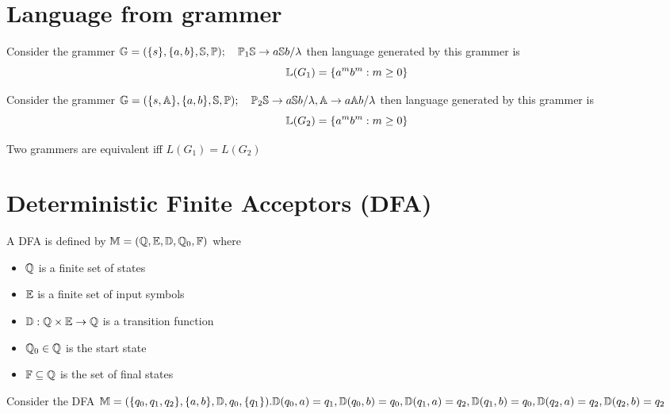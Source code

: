 
\section{Language from grammer}

\begin{example}
    Consider the grammer $ \mathbb{G} = ( \{s\} , \{a, b\} , \mathbb{S}, \mathbb{P} ) ; \quad \mathbb{P}_1 \mathbb{S} \rightarrow a \mathbb{S} b / \lambda $ then language generated by this grammer is $$\mathbb{L}(G_1) = \{ a^mb^m : m \geq 0 \} $$
\end{example}

\begin{example}
    Consider the grammer $ \mathbb{G} = ( \{s, \mathbb{A} \} , \{a, b\} , \mathbb{S}, \mathbb{P} ) ; \quad \mathbb{P}_2 \mathbb{S} \rightarrow a \mathbb{S} b / \lambda, \mathbb{A} \rightarrow a \mathbb{A} b / \lambda $ then language generated by this grammer is $$\mathbb{L}(G_2) = \{ a^mb^m : m \geq 0 \} $$
\end{example}

\begin{definition}{}
    Two grammers are equivalent iff $L(G_1) = L(G_2)$
\end{definition}

\section{Deterministic Finite Acceptors (DFA)}

\begin{definition}{}
    A DFA is defined by $\mathbb{M} = ( \mathbb{Q}, \mathbb{E}, \mathbb{D}, \mathbb{Q}_0, \mathbb{F} )$ where \begin{itemize}
        \item $\mathbb{Q}$ is a finite set of states
        \item $\mathbb{E}$ is a finite set of input symbols
        \item $\mathbb{D} : \mathbb{Q} \times \mathbb{E} \rightarrow \mathbb{Q}$ is a transition function
        \item $\mathbb{Q}_0 \in \mathbb{Q}$ is the start state
        \item $\mathbb{F} \subseteq \mathbb{Q}$ is the set of final states
    \end{itemize}
\end{definition}

\begin{example}
    Consider the DFA $ \mathbb{M} = ( \{q_0, q_1, q_2\} , \{a, b\} , \mathbb{D}, q_0, \{q_1\} ). \\  \mathbb{D}(q_0, a) = q_1, \mathbb{D}(q_0, b) = q_0, \mathbb{D}(q_1, a) = q_2, \mathbb{D}(q_1, b) = q_0, \mathbb{D}(q_2, a) = q_2, \mathbb{D}(q_2, b) = q_2 $
\end{example}

